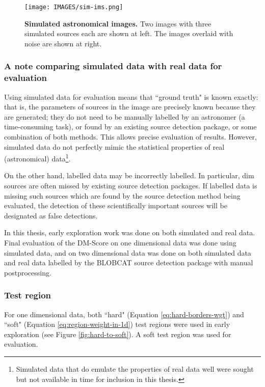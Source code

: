 \begin{figure}
\centering
\texttt{[image: IMAGES/sim-ims.png]}
\caption[Simulated astronomical images]{\textbf{Simulated astronomical images.} Two images with three simulated sources each are shown at left. The images overlaid with noise are shown at right.}
\label{fig:sim-ims-dm}
\end{figure}

\subsubsection{A note comparing simulated data with real data for evaluation}

Using simulated data for evaluation means that ``ground truth" is known exactly: that is, the parameters of sources in the image are precisely known because they are generated; they do not need to be manually labelled by an astronomer (a time-consuming task), or found by an existing source detection package, or some combination of both methods. This allows precise evaluation of results. However, simulated data do not perfectly mimic the statistical properties of real (astronomical) data\footnote{Simulated data that do emulate the properties of real data well were sought but not available in time for inclusion in this thesis.}. 

On the other hand, labelled data may be incorrectly labelled. In particular, dim sources are often missed by existing source detection packages. If labelled data is missing such sources which are found by the source detection method being evaluated, the detection of these scientifically important sources will be designated as false detections.

In this thesis, early exploration work was done on both simulated and real data. Final evaluation of the DM-Score on one dimensional data was done using simulated data, and on two dimensional data was done on both simulated data and real data labelled by the BLOBCAT source detection package with manual postprocessing.

\subsubsection{Test region}
For one dimensional data, both ``hard" (Equation \ref{eq:hard-borders-wgt}) and ``soft" (Equation \ref{eq:region-weight-in-1d}) test regions were used in early exploration (see Figure \ref{fig:hard-to-soft}). A soft test region was used for evaluation.

